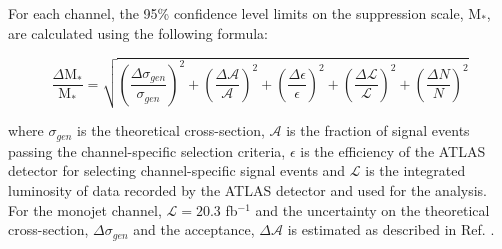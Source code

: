 \begin{flushleft}
For each channel, the 95\% confidence level limits on the suppression scale, M$_{*}$, are calculated using the following formula:

\begin{equation}
\label{uncertainty_formula}
\frac{\Delta \mbox{M}_{*}}{\mbox{M}_{*}} = \sqrt{\left(\frac{\Delta \sigma_{gen}}{\sigma_{gen}}\right)^{2} + \left(\frac{\Delta \mathcal{A}}{\mathcal{A}}\right)^{2} + \left(\frac{\Delta \epsilon}{\epsilon}\right)^{2} + \left(\frac{\Delta \mathcal{L}}{\mathcal{L}}\right)^{2} + \left(\frac{\Delta N}{N}\right)^{2}}
\end{equation}

where $\sigma_{gen}$ is the theoretical cross-section, $\mathcal{A}$ is the fraction of signal events passing the channel-specific selection criteria, $\epsilon$ is the efficiency of the ATLAS detector for selecting channel-specific signal events and $\mathcal{L}$ is the integrated luminosity of data recorded by the ATLAS detector and used for the analysis. For the monojet channel, $\mathcal{L}=20.3$ fb$^{-1}$ and the uncertainty on the theoretical cross-section, $\Delta \sigma_{gen}$ and the acceptance, $\Delta \mathcal{A}$ is estimated as described in Ref. \cite{CERN-THESIS-2015-038}.  
\end{flushleft}